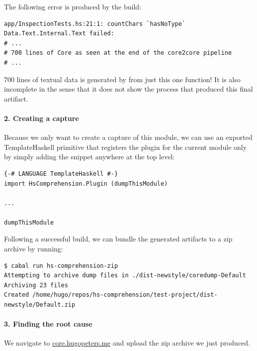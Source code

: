 The following error is produced by the build:

\begin{verbatim}
app/InspectionTests.hs:21:1: countChars `hasNoType` Data.Text.Internal.Text failed:
# ...
# 700 lines of Core as seen at the end of the core2core pipeline
# ...
\end{verbatim}

700 lines of textual data is generated by  from just this one function!
It is also incomplete in the sense that it does not show the process that produced this final
artifact.

\paragraph{2. Creating a capture}

Because we only want to create a capture of this module, we can use an exported TemplateHaskell primitive
that registers the plugin for the current module only by simply adding the  snippet 
anywhere at the top level: 

\begin{listing}[H]
\begin{verbatim}
{-# LANGUAGE TemplateHaskell #-}
import HsComprehension.Plugin (dumpThisModule)

...

dumpThisModule
\end{verbatim}
\end{listing}

Following a successful build, we can bundle the generated artifacts to a zip archive by running:

\begin{listing}[H]
\begin{verbatim}
$ cabal run hs-comprehension-zip
Attempting to archive dump files in ./dist-newstyle/coredump-Default
Archiving 23 files
Created /home/hugo/repos/hs-comprehension/test-project/dist-newstyle/Default.zip
\end{verbatim}
\end{listing}

\paragraph{3. Finding the root cause}
We navigate to \href{https://core.hugopeters.me}{core.hugopeters.me} and upload the zip archive we just
produced.

